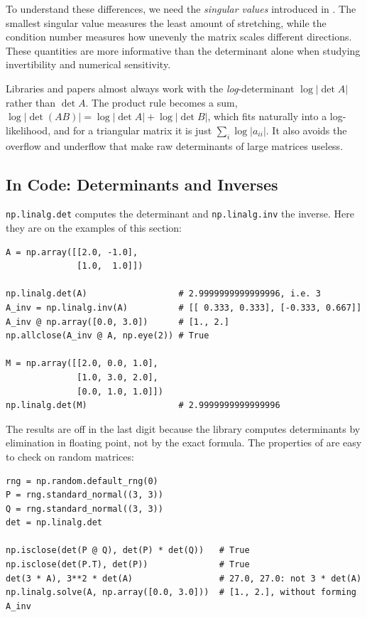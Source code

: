 To understand these differences, we need the
\emph{singular values} introduced in .
The smallest singular value measures the least amount of
stretching, while the condition number measures how unevenly
the matrix scales different directions. These quantities are
more informative than the determinant alone when studying
invertibility and numerical sensitivity.


\begin{aibox}
  Libraries and papers almost always work with the \emph{log}-determinant
  $\log |\det A|$ rather than $\det A$. The product rule becomes a sum,
  $\log |\det(AB)| = \log |\det A| + \log |\det B|$, which fits naturally
  into a log-likelihood, and for a triangular matrix it is just
  $\sum_i \log |a_{ii}|$. It also avoids the overflow and underflow that
  make raw determinants of large matrices useless.
\end{aibox}

\subsection{In Code: Determinants and Inverses}
\label{sec:ch03-det-code}

\texttt{np.linalg.det} computes the determinant and
\texttt{np.linalg.inv} the inverse. Here they are on the examples of this
section:

\begin{lstlisting}
A = np.array([[2.0, -1.0],
              [1.0,  1.0]])

np.linalg.det(A)                  # 2.9999999999999996, i.e. 3
A_inv = np.linalg.inv(A)          # [[ 0.333, 0.333], [-0.333, 0.667]]
A_inv @ np.array([0.0, 3.0])      # [1., 2.]
np.allclose(A_inv @ A, np.eye(2)) # True

M = np.array([[2.0, 0.0, 1.0],
              [1.0, 3.0, 2.0],
              [0.0, 1.0, 1.0]])
np.linalg.det(M)                  # 2.9999999999999996
\end{lstlisting}

The results are off in the last digit because the library computes
determinants by elimination in floating point, not by the exact formula.
The properties of  are easy to check on random
matrices:

\begin{lstlisting}
rng = np.random.default_rng(0)
P = rng.standard_normal((3, 3))
Q = rng.standard_normal((3, 3))
det = np.linalg.det

np.isclose(det(P @ Q), det(P) * det(Q))   # True
np.isclose(det(P.T), det(P))              # True
det(3 * A), 3**2 * det(A)                 # 27.0, 27.0: not 3 * det(A)
np.linalg.solve(A, np.array([0.0, 3.0]))  # [1., 2.], without forming A_inv
\end{lstlisting}

